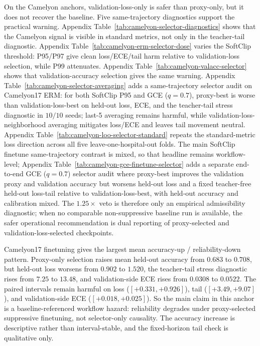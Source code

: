 On the Camelyon anchors, validation-loss-only is safer than proxy-only, but it does not recover the baseline.
Five same-trajectory diagnostics support the practical warning.
Appendix Table~\ref{tab:camelyon-selector-diagnostics} shows that the Camelyon signal is visible in standard metrics, not only in the teacher-tail diagnostic.
Appendix Table~\ref{tab:camelyon-erm-selector-dose} varies the SoftClip threshold: P95/P97 give clean loss/ECE/tail harm relative to validation-loss selection, while P99 attenuates.
Appendix Table~\ref{tab:camelyon-valacc-selector} shows that validation-accuracy selection gives the same warning.
Appendix Table~\ref{tab:camelyon-selector-averaging} adds a same-trajectory selector audit on Camelyon17 ERM: for both SoftClip P95 and GCE ($q=0.7$), proxy-best is worse than validation-loss-best on held-out loss, ECE, and the teacher-tail stress diagnostic in $10/10$ seeds; last-5 averaging remains harmful, while validation-loss-neighborhood averaging mitigates loss/ECE and leaves tail movement neutral.
Appendix Table~\ref{tab:camelyon-loo-selector-standard} repeats the standard-metric loss direction across all five leave-one-hospital-out folds.
The main SoftClip finetune same-trajectory contrast is mixed, so that headline remains workflow-level; Appendix Table~\ref{tab:camelyon-gce-finetune-selector} adds a separate end-to-end GCE ($q=0.7$) selector audit where proxy-best improves the validation proxy and validation accuracy but worsens held-out loss and a fixed teacher-free held-out loss-tail relative to validation-loss-best, with held-out accuracy and calibration mixed.
The $1.25\times$ veto is therefore only an empirical admissibility diagnostic; when no comparable non-suppressive baseline run is available, the safer operational recommendation is dual reporting of proxy-selected and validation-loss-selected checkpoints.

Camelyon17 finetuning gives the largest mean accuracy-up / reliability-down pattern.
Proxy-only selection raises mean held-out accuracy from $0.683$ to $0.708$, but held-out loss worsens from $0.902$ to $1.520$, the teacher-tail stress diagnostic rises from $7.25$ to $13.48$, and validation-side ECE rises from $0.0308$ to $0.0522$.
The paired intervals remain harmful on loss ($[+0.331,+0.926]$), tail ($[+3.49,+9.07]$), and validation-side ECE ($[+0.018,+0.025]$).
So the main claim in this anchor is a baseline-referenced workflow hazard: reliability degrades under proxy-selected suppressive finetuning, not selector-only causality.
The accuracy increase is descriptive rather than interval-stable, and the fixed-horizon tail check is qualitative only.

